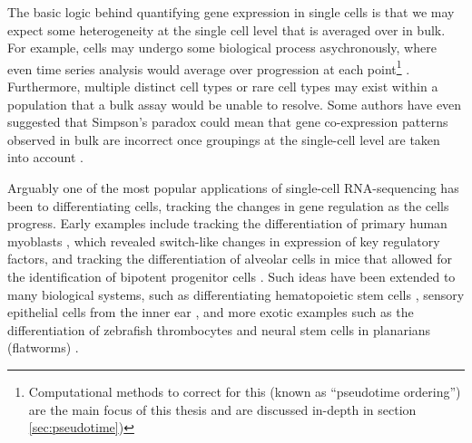 The basic logic behind quantifying gene expression in single cells is that we may expect some heterogeneity at the single cell level that is averaged over in bulk. For example, cells may undergo some biological process asychronously, where even time series analysis would average over progression at each point\footnote{Computational methods to correct for this (known as ``pseudotime ordering'') are the main focus of this thesis and are discussed in-depth in section \ref{sec:pseudotime})} \cite{Trapnell2014-xi}. Furthermore, multiple distinct cell types \cite{Kolodziejczyk2015-jd} or rare cell types \cite{Grun2015-xz} may exist within a population that a bulk assay would be unable to resolve. Some authors have even suggested that Simpson's paradox could mean that gene co-expression patterns observed in bulk are incorrect once groupings at the single-cell level are taken into account \cite{Trapnell2015-mz}.


Arguably one of the most popular applications of single-cell RNA-sequencing has been to differentiating cells, tracking the changes in gene regulation as the cells progress. Early examples include tracking the differentiation of primary human myoblasts \cite{Trapnell2014-xi}, which revealed switch-like changes in expression of key regulatory factors, and tracking the differentiation of alveolar cells in mice that allowed for the identification of bipotent progenitor cells \cite{Treutlein2014-ob}. Such ideas have been extended to many biological systems, such as differentiating hematopoietic stem cells \cite{zhou2016tracing,Kowalczyk2015-li}, sensory epithelial cells from the inner ear \cite{Burns2015}, and more exotic examples such as the differentiation of zebrafish thrombocytes \cite{Macaulay2016-vv} and neural stem cells in planarians (flatworms) \cite{molinaro2016silico}.

